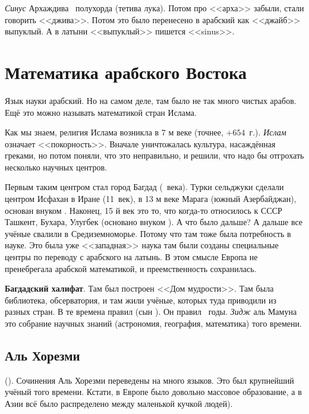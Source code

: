 \documentclass[a4paper,oneside,fleqn,10pt]{article}
\begin{document}
\emph{Синус}  Архаждива~ полухорда (тетива лука).
Потом про <<арха>> забыли, стали говорить <<джива>>.
Потом это было перенесено в арабский как <<джайб>> выпуклый. А в латыни <<выпуклый>> пишется <<sinus>>.

\section{Математика арабского Востока}


Язык науки арабский. Но на самом деле, там было не так много чистых
арабов. Ещё это можно называть математикой стран Ислама.

Как мы знаем, религия Ислама возникла в $7$ м веке (точнее, $+654$~г.). \emph{Ислам} означает <<покорность>>.
Вначале уничтожалась культура, насаждённая греками,
но потом поняли, что это неправильно, и решили, что надо бы отгрохать несколько научных центров.

Первым таким центром стал город Багдад (~века). Турки сельджуки сделали центром Исфахан
в Иране (11~век), в 13 м веке Марага (южный Азербайджан), основан внуком .
Наконец, 15 й век это то, что когда-то относилось к СССР Ташкент, Бухара,
Улугбек (основано внуком ). А что было дальше? А дальше все учёные свалили в Средиземноморье.
Потому что там тоже была потребность в науке.
Это была уже <<западная>> наука там были созданы специальные центры по переводу с арабского
на латынь. В этом смысле Европа не пренебрегала арабской математикой,
и преемственность сохранилась.

\textbf{Багдадский халифат}. Там был построен <<Дом мудрости>>. Там была библиотека, обсерватория, и там жили
учёные, которых туда приводили из разных стран.  В те времена правил  (сын
).
Он правил ~годы. \emph{Зидж} аль Мамуна это собрание научных знаний
(астрономия, география, математика) того времени.

\subsection{Аль Хорезми}

 (). Сочинения Аль Хорезми переведены на много языков. Это был крупнейший
учёный того времени. Кстати, в Европе было довольно массовое образование, а в Азии всё было распределено между
маленькой кучкой людей).
\end{document}
